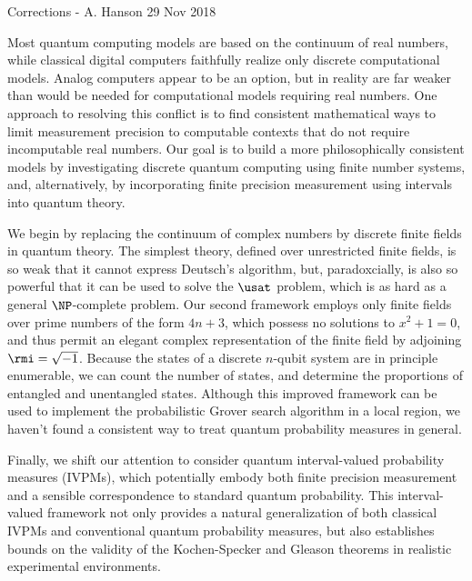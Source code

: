 Corrections - A. Hanson  29 Nov 2018

\begin{abstract*}

Most quantum computing models are based on
the continuum of real numbers, while classical digital
computers faithfully realize only discrete computational
models.   Analog computers appear to be an option, but in reality are
far weaker than would be needed for computational models requiring
real numbers.   One approach to resolving this conflict is to
find consistent mathematical ways to limit measurement precision
to computable contexts that do not require incomputable real numbers.
Our goal is to build a more philosophically consistent models by
investigating discrete quantum computing using finite number systems, 
and, alternatively, by incorporating finite precision measurement
using intervals into quantum theory.

We begin by replacing the continuum of complex numbers by discrete
finite fields in quantum theory. The simplest theory, defined over
unrestricted finite fields, is so weak that it cannot express
Deutsch's algorithm, but, paradoxcially, is also so powerful that it
can be used to solve the $\usat$ problem, which is as hard as a
general $\NP$-complete problem.  Our second framework employs only
finite fields over prime numbers of the form $4n+3$, which possess no
solutions to $x^{2}+1=0$, and thus permit an elegant complex
representation of the finite field by adjoining
$\rmi=\sqrt{-1}$. Because the states of a discrete $n$-qubit system
are in principle enumerable, we can count the number of states, and
determine the proportions of entangled and unentangled
states. Although this improved framework can be used to implement the
probabilistic Grover search algorithm in a local region, we haven't
found a consistent way to treat quantum probability measures
in general.

Finally, we shift our attention
to consider quantum interval-valued probability measures (IVPMs),
which potentially embody both finite precision measurement and
a sensible correspondence to standard quantum probability.
This interval-valued framework not only provides a natural generalization
of both classical IVPMs and conventional quantum probability measures,
but also establishes bounds on the validity of the Kochen-Specker
and Gleason theorems in realistic experimental environments.

\end{abstract*}

